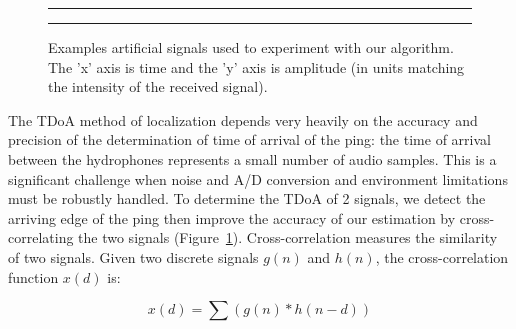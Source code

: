 \begin{figure}
  \hrule
  \vspace{.05in}
\centering
{}
  \vspace{.05in}
\hrule
\caption{Examples artificial signals used to experiment with our
  algorithm. The 'x' axis is time and the 'y' axis is amplitude (in
  units matching the intensity of the received signal).}  \label{waves}
\end{figure}


The TDoA method of localization depends very heavily on the accuracy
and precision of the determination of time of arrival of the ping: the time of arrival between the
hydrophones represents a small number of audio samples. This is a
significant challenge when noise and A/D conversion and environment
limitations must be robustly handled. To determine the TDoA of 2
signals, we detect the arriving edge of the ping then improve the
accuracy of our estimation by cross-correlating the two signals (Figure~\ref{waves}).
Cross-correlation  measures the similarity of two
signals. Given two discrete signals $g(n)$ and $h(n)$, the
cross-correlation function $x(d)$ is:

\begin{equation}
x(d) = \sum( g(n)*h(n-d) )
\end{equation}

